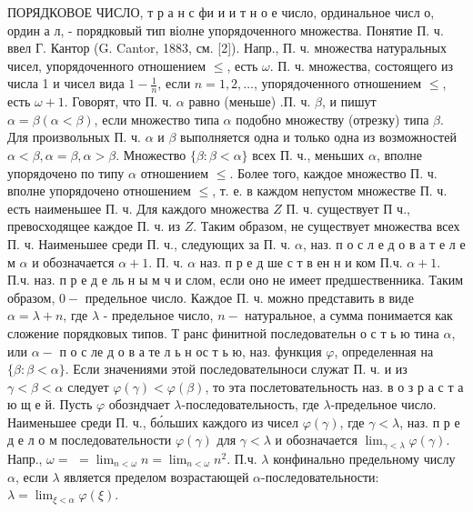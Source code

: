 \documentclass[10pt]{article}
\begin{document}
ПОРЯДКОВОЕ ЧИСЛО, т р а н с фи и и т н о е число, ординальное числ о, ордин а л, - порядковый тип віолне упорядоченного множества. Понятие П. ч. ввел Г. Кантор (G. Cantor, 1883, см. [2]). Напр., П. ч. множества натуральных чисел, упорядоченного отношением $\leqslant$, есть $\omega$. П. ч. множества, состоящего из числа 1 и чисел вида $1-\frac{1}{n}$, если $n=1,2, \ldots$, упорядоченного отношением $\leqslant$, есть $\omega+1$. Говорят, что П. ч. $\alpha$ равно (меньше) .П. ч. $\beta$, и пишут $\alpha=\beta(\alpha<\beta)$, если множество типа $\alpha$ подобно множеству (отрезку) типа $\beta$. Для произвольных П. ч. $\alpha$ и $\beta$ выполняется одна и только одна из возможностей $\alpha<\beta, \alpha=\beta, \alpha>\beta$. Множество $\{\beta: \beta<\alpha\}$ всех П. ч., меньших $\alpha$, вполне упорядочено по типу $\alpha$ отношением $\leqslant$. Более того, каждое множество П. ч. вполне упорядочено отношением $\leqslant$, т. е. в каждом непустом множестве П. ч. есть наименьшее П. ч. Для каждого множества $Z$ П. ч. существует П ч., превосходящее каждое П. ч. из $Z$. Таким образом, не существует множества всех П. ч. Наименьшее среди П. ч., следующих за П. ч. $\alpha$, наз. п о с л е д о в а т е л е м $\alpha$ и обозначается $\alpha+1$. П. ч. $\alpha$ наз. п р е д ше с т в ен н и ком П.ч. $\alpha+1$. П.ч. наз. п р е д е ль н ы м ч и слом, если оно не имеет предшественника. Таким образом, $0-$ предельное число. Каждое П. ч. можно представить в виде $\alpha=\lambda+n$, где $\lambda$ - предельное число, $n-$ натуральное, а сумма понимается как сложение порядковых типов. Т ранс финитной последовательн о с т ь ю тина $\alpha$, или $\alpha-$ п о с ле д о в а те л ь н ос т ь ю, наз. функция $\varphi$, определенная на $\{\beta: \beta<\alpha\}$. Если значениями этой последователыноси служат П. ч. и из $\gamma<\beta<\alpha$ следует $\varphi(\gamma)<\varphi(\beta)$, то эта послетовательность наз. в о з р а с т а ю щ е й. Пусть $\varphi$ обозндчает $\lambda$-последовательность, где $\lambda$-предельное число. Наименьшее среди П. ч., бо́льших каждого из чисел $\varphi(\gamma)$, где $\gamma<\lambda$, наз. п р е д е л о м последовательности $\varphi(\gamma)$ для $\gamma<\lambda$ и обозначается $\lim _{\gamma<\lambda} \varphi(\gamma)$. Напр., $\omega=$ $=\lim _{n<\omega} n=\lim _{n<\omega} n^{2}$. П.ч. $\lambda$ конфинально предельному числу $\alpha$, если $\lambda$ является пределом возрастающей $\alpha$-последовательности: $\lambda=\lim _{\xi<\alpha} \varphi(\xi)$.
\end{document}
